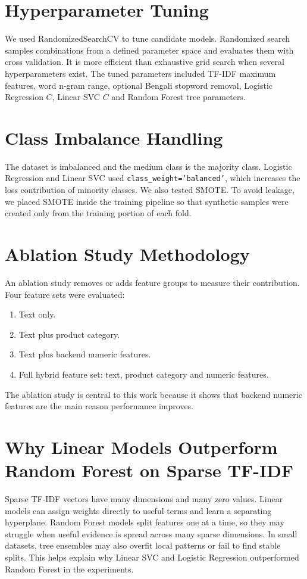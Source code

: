 \documentclass[12pt,a4paper,openany]{book}
\begin{document}
\section{Hyperparameter Tuning}
We used RandomizedSearchCV to tune candidate models. Randomized search samples combinations from a defined parameter space and evaluates them with cross validation. It is more efficient than exhaustive grid search when several hyperparameters exist. The tuned parameters included TF-IDF maximum features, word n-gram range, optional Bengali stopword removal, Logistic Regression $C$, Linear SVC $C$ and Random Forest tree parameters.

\section{Class Imbalance Handling}
The dataset is imbalanced and the medium class is the majority class. Logistic Regression and Linear SVC used \texttt{class\_weight='balanced'}, which increases the loss contribution of minority classes. We also tested SMOTE. To avoid leakage, we placed SMOTE inside the training pipeline so that synthetic samples were created only from the training portion of each fold.

\section{Ablation Study Methodology}
An ablation study removes or adds feature groups to measure their contribution. Four feature sets were evaluated:
\begin{enumerate}
  \item Text only.
  \item Text plus product category.
  \item Text plus backend numeric features.
  \item Full hybrid feature set: text, product category and numeric features.
\end{enumerate}
The ablation study is central to this work because it shows that backend numeric features are the main reason performance improves.

\section{Why Linear Models Outperform Random Forest on Sparse TF-IDF}
Sparse TF-IDF vectors have many dimensions and many zero values. Linear models can assign weights directly to useful terms and learn a separating hyperplane. Random Forest models split features one at a time, so they may struggle when useful evidence is spread across many sparse dimensions. In small datasets, tree ensembles may also overfit local patterns or fail to find stable splits. This helps explain why Linear SVC and Logistic Regression outperformed Random Forest in the experiments.
\end{document}
